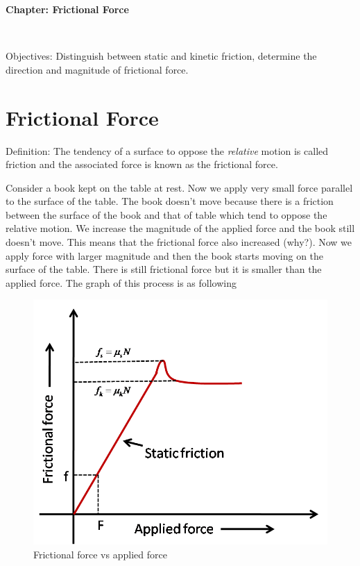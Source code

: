 \documentclass[10pt]{article}
\date{2014-6-22}
\begin{document}
\begin{center}
\begin{Large}\textbf{Chapter: Frictional Force}\end{Large} \\
\smallskip
\end{center}
Objectives: Distinguish between static and kinetic friction, determine the direction and magnitude of frictional force.
\section{Frictional Force}
Definition: The tendency of a surface to oppose the \emph{relative} motion is called friction and the associated force is known as the frictional force. 

Consider a book kept on the table at rest.  Now we apply very small force parallel to the surface of the table.  The book doesn't move because there is a friction between the surface of the book and that of table which tend to oppose the relative motion.  We increase the magnitude of the applied force and the book still doesn't move.  This means that the frictional force also increased (why?). Now we apply force with larger magnitude and then the book starts moving on the surface of the table.  There is still frictional force but it is smaller than the applied force.  The graph of this process is as following      
\begin{figure}[h]
\label{skfriction}
\includegraphics[scale=.5]{static_fric}
\centering
\caption{Frictional force vs applied force}
\centering
\end{figure}
\end{document}
